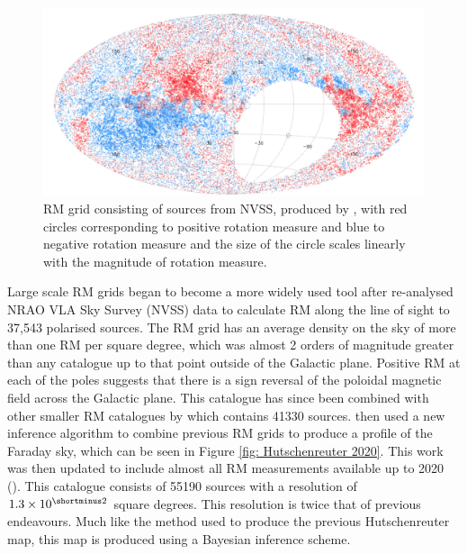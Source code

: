 
\begin{figure}
    \centering
    \includegraphics[width=\linewidth]{Thesis_Template/Figures/NVSS_RM_Grid.png}
    \caption{RM grid consisting of sources from NVSS, produced by \cite{Taylor_20009}, with red circles corresponding to positive rotation measure and blue to negative rotation measure and the size of the circle scales linearly with the magnitude of rotation measure.}
    \label{fig:Taylor RM grid}
\end{figure}

Large scale RM grids began to become a more widely used tool after \cite{Taylor_20009} re-analysed NRAO VLA Sky Survey (NVSS) data to calculate RM along the line of sight to 37,543 polarised sources. The RM grid has an average density on the sky of more than one RM per square degree, which was almost 2 orders of magnitude greater than any catalogue up to that point outside of the Galactic plane. Positive RM at each of the poles suggests that there is a sign reversal of the poloidal magnetic field across the Galactic plane. This catalogue has since been combined with other smaller RM catalogues by \cite{Oppermann_2012} which contains 41330 sources. \cite{Hutschenreuter_2020} then used a new inference algorithm to combine previous RM grids to produce a profile of the Faraday sky, which can be seen in Figure \ref{fig: Hutschenreuter 2020}.  This work was then updated to include almost all RM measurements available up to 2020 (\cite{Hutschenreuter_2022}). This catalogue 
consists of 55190 sources with a resolution of $1.3 
\times 10^{\shortminus2}$ square degrees. 
This resolution is twice that of previous endeavours. 
Much like the method used to produce the previous Hutschenreuter map, this map is produced using a Bayesian inference scheme. 

